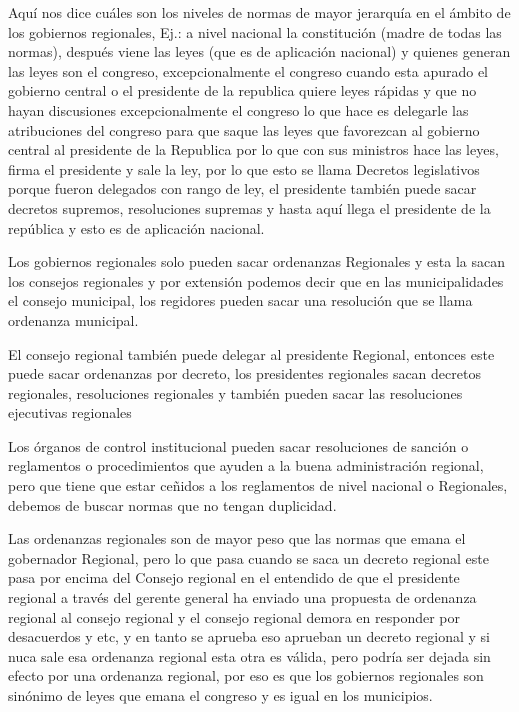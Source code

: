 \documentclass[
  a4paper,
]{article}
\begin{document}
Aquí nos dice cuáles son los niveles de normas de mayor jerarquía en el
ámbito de los gobiernos regionales, Ej.: a nivel nacional la
constitución (madre de todas las normas), después viene las leyes (que
es de aplicación nacional) y quienes generan las leyes son el congreso,
excepcionalmente el congreso cuando esta apurado el gobierno central o
el presidente de la republica quiere leyes rápidas y que no hayan
discusiones excepcionalmente el congreso lo que hace es delegarle las
atribuciones del congreso para que saque las leyes que favorezcan al
gobierno central al presidente de la Republica por lo que con sus
ministros hace las leyes, firma el presidente y sale la ley, por lo que
esto se llama Decretos legislativos porque fueron delegados con rango de
ley, el presidente también puede sacar decretos supremos, resoluciones
supremas y hasta aquí llega el presidente de la república y esto es de
aplicación nacional.

Los gobiernos regionales solo pueden sacar ordenanzas Regionales y esta
la sacan los consejos regionales y por extensión podemos decir que en
las municipalidades el consejo municipal, los regidores pueden sacar una
resolución que se llama ordenanza municipal.

El consejo regional también puede delegar al presidente Regional,
entonces este puede sacar ordenanzas por decreto, los presidentes
regionales sacan decretos regionales, resoluciones regionales y también
pueden sacar las resoluciones ejecutivas regionales

Los órganos de control institucional pueden sacar resoluciones de
sanción o reglamentos o procedimientos que ayuden a la buena
administración regional, pero que tiene que estar ceñidos a los
reglamentos de nivel nacional o Regionales, debemos de buscar normas que
no tengan duplicidad.

Las ordenanzas regionales son de mayor peso que las normas que emana el
gobernador Regional, pero lo que pasa cuando se saca un decreto regional
este pasa por encima del Consejo regional en el entendido de que el
presidente regional a través del gerente general ha enviado una
propuesta de ordenanza regional al consejo regional y el consejo
regional demora en responder por desacuerdos y etc, y en tanto se
aprueba eso aprueban un decreto regional y si nuca sale esa ordenanza
regional esta otra es válida, pero podría ser dejada sin efecto por una
ordenanza regional, por eso es que los gobiernos regionales son sinónimo
de leyes que emana el congreso y es igual en los municipios.
\end{document}
